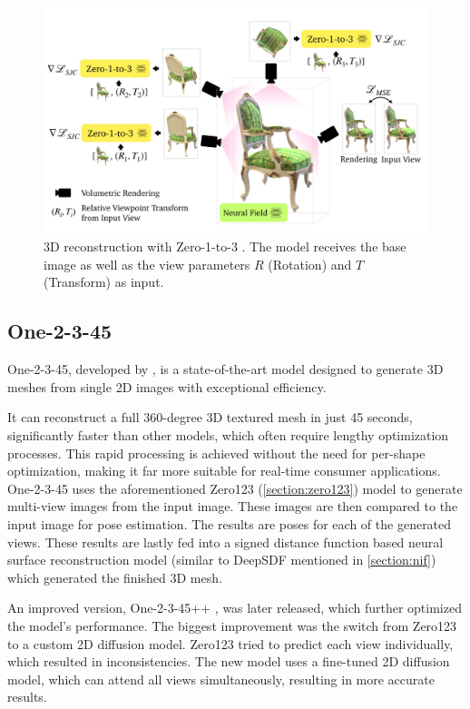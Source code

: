 \begin{figure}
    \centering
    \includegraphics[width=0.9\linewidth]{images/zero-1-to-3.jpg}
    \caption{3D reconstruction with Zero-1-to-3 \autocite{liu_zero-1--3_2023}. The model receives the base image as well as the view parameters \(R\) (Rotation) and \(T\) (Transform) as input.}
    \label{fig:zero-1-to-3}
\end{figure}

\subsection{One-2-3-45} \label{section:one-2-3-45}
One-2-3-45, developed by \textcite{liu_one-2-3-45_2023}, is a state-of-the-art model designed to generate 3D meshes from single 2D images with exceptional efficiency.

It can reconstruct a full 360-degree 3D textured mesh in just 45 seconds, significantly faster than other models, which often require lengthy optimization processes. This rapid processing is achieved without the need for per-shape optimization, making it far more suitable for real-time consumer applications.
One-2-3-45 uses the aforementioned Zero123 (\ref{section:zero123}) model to generate multi-view images from the input image. These images are then compared to the input image for pose estimation. The results are poses for each of the generated views.
These results are lastly fed into a signed distance function based neural surface reconstruction model (similar to DeepSDF mentioned in \ref{section:nif}) which generated the finished 3D mesh.

An improved version, One-2-3-45++ \autocite{liu_one-2-3-45_2024}, was later released, which further optimized the model's performance.
The biggest improvement was the switch from Zero123 to a custom 2D diffusion model. Zero123 tried to predict each view individually, which resulted in inconsistencies. The new model uses a fine-tuned 2D diffusion model, which can attend all views simultaneously, resulting in more accurate results.

